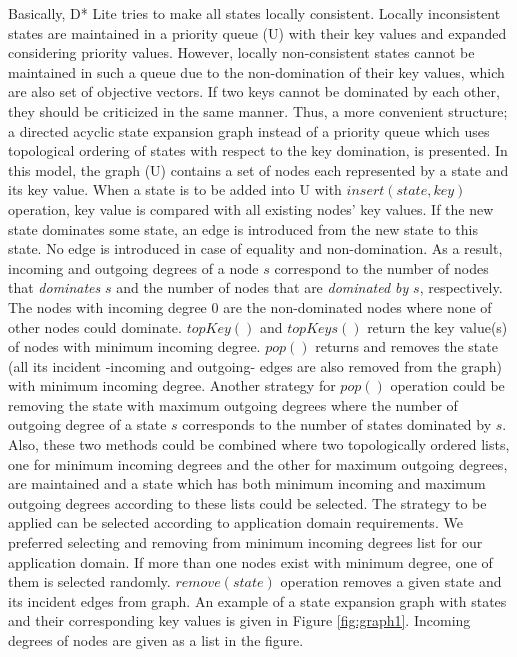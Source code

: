 \documentclass[10pt,journal]{IEEEtran}
\begin{document}
Basically, D* Lite tries to make all states locally consistent. Locally inconsistent states are maintained in  a priority queue (U) with their key values and expanded considering priority values. However, locally non-consistent states cannot be maintained in such a queue due to the non-domination of their key values, which are also set of objective vectors. If two keys cannot be dominated by each other, they should be criticized in the same manner. Thus, a more convenient structure; a directed acyclic state expansion graph instead of a priority queue which uses topological ordering of states with respect to the key domination, is presented. In this model, the graph (U) contains a set of nodes each represented by a state and its key value. When a state is to be added into U with $insert(state, key)$ operation, key value is compared with all existing nodes' key values. If the new state dominates some state, an edge is introduced from the new state to this state. No edge is introduced in case of equality and non-domination. As a result, incoming and outgoing degrees of a node $s$ correspond to the number of nodes that \textit{dominates} $s$ and the number of nodes that are \textit{dominated by} $s$, respectively. The nodes with incoming degree 0 are the non-dominated nodes where none of other nodes could dominate. $topKey()$ and $topKeys()$ return the key value(s) of nodes with minimum incoming degree. $pop()$ returns and removes the state (all its incident -incoming and outgoing- edges are also removed from the graph) with minimum incoming degree. Another strategy for $pop()$ operation could be removing the state with maximum outgoing degrees where the number of outgoing degree of a state $s$ corresponds to the number of states  dominated by $s$. Also, these two methods could be combined where two topologically ordered lists, one for minimum incoming degrees and the other  for maximum outgoing degrees, are maintained and a state which has both minimum incoming and maximum outgoing degrees according to these lists could be selected. The strategy to be applied can be selected according to application domain requirements. We preferred selecting and removing from minimum incoming degrees list for our application domain. If more than one nodes exist with minimum degree, one of them is selected randomly. $remove(state)$ operation removes a given state and its incident edges from graph. An example of a state expansion graph with states and their corresponding key values is given in Figure \ref{fig:graph1}. Incoming degrees of nodes are given as a list in the figure.
\end{document}
